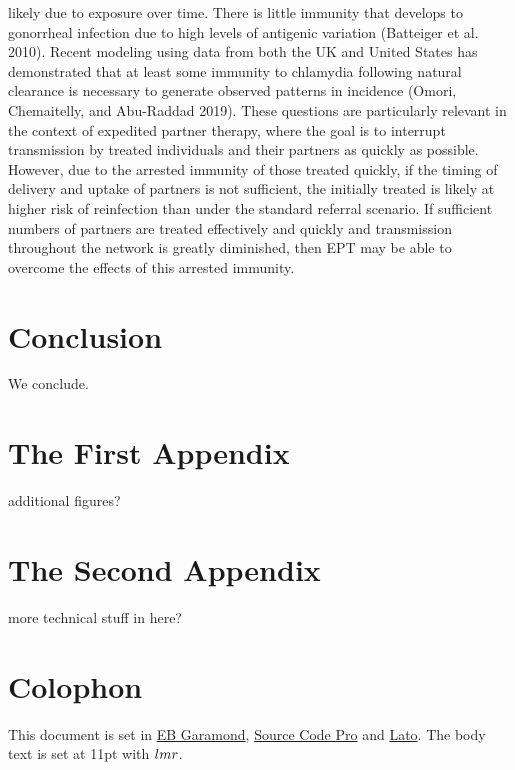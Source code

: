 \documentclass [11pt, proquest] {uwthesis}[2015/03/03]
\begin{document}
likely due to exposure over time. There is little immunity that develops
to gonorrheal infection due to high levels of antigenic variation
(Batteiger et al. 2010). Recent modeling using data from both the UK and
United States has demonstrated that at least some immunity to chlamydia
following natural clearance is necessary to generate observed patterns
in incidence (Omori, Chemaitelly, and Abu-Raddad 2019). These questions
are particularly relevant in the context of expedited partner therapy,
where the goal is to interrupt transmission by treated individuals and
their partners as quickly as possible. However, due to the arrested
immunity of those treated quickly, if the timing of delivery and uptake
of partners is not sufficient, the initially treated is likely at higher
risk of reinfection than under the standard referral scenario. If
sufficient numbers of partners are treated effectively and quickly and
transmission throughout the network is greatly diminished, then EPT may
be able to overcome the effects of this arrested immunity.

\chapter*{Conclusion}\label{conclusion}

We conclude.

\appendix

\chapter{The First Appendix}\label{the-first-appendix}

additional figures?

\chapter{The Second Appendix}\label{the-second-appendix}

more technical stuff in here?

\chapter*{Colophon}\label{colophon}

This document is set in \href{https://github.com/georgd/EB-Garamond}{EB
Garamond}, \href{https://github.com/adobe-fonts/source-code-pro/}{Source
Code Pro} and \href{http://www.latofonts.com/lato-free-fonts/}{Lato}.
The body text is set at 11pt with \(\familydefault\).
\end{document}
